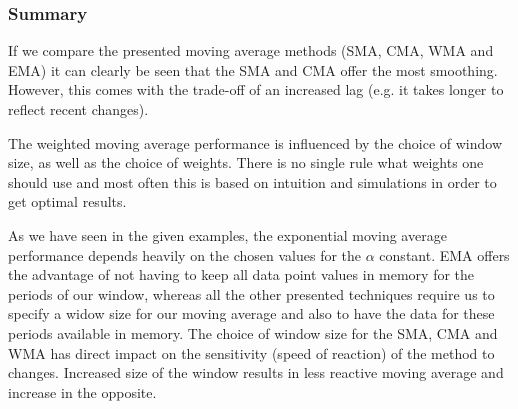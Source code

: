 \begin{figure}[ht]
	\caption{}
	\label{fig:emaGraph}
\end{figure}
\FloatBarrier
\subsubsection{Summary}
If we compare the presented moving average methods (SMA, CMA, WMA and EMA) it can clearly be seen that the SMA and CMA offer the most smoothing. However, this comes with the trade-off of an increased lag (e.g. it takes longer to reflect recent changes). 

The weighted moving average performance is influenced by the choice of window size, as well as the choice of weights. There is no single rule what weights one should use and most often this is based on intuition and simulations in order to get optimal results.

As we have seen in the given examples, the exponential moving average performance depends heavily on the chosen values for the $\alpha$ constant. EMA offers the advantage of not having to keep all data point values in memory for the periods of our window, whereas all the other presented techniques require us to specify a widow size for our moving average and also to have the data for these periods available in memory. The choice of window size for the SMA, CMA and WMA has direct impact on the sensitivity (speed of reaction) of the method to changes. Increased size of the window results in less reactive moving average and increase in the opposite.

